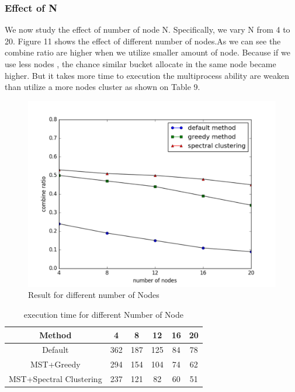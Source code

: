 \documentclass{vldb}
\begin{document}
\subsubsection{Effect of N}
We now study the effect of number of node N. Specifically, we vary N from 4 to 20. Figure 11 shows the effect of different number of nodes.As we can see the combine ratio are higher when we utilize smaller amount of node. Because if we use less nodes , the chance similar bucket allocate in the same node became higher. But it takes more time to execution the multiprocess ability are weaken than utilize a more nodes cluster as shown on Table 9.

\begin{figure}
\centering
\includegraphics[scale=0.45]{FNodeNumber}
\caption{Result for different number of Nodes}
\label{fig:NodeNumber}
\end{figure}

\begin{table} [h]
\centering
\caption{execution time for different Number of Node}
\label{tab:table}
\begin{tabular}{|c|c|c|c|c|c|} \hline
Method & 4 & 8 & 12 & 16 & 20 \\\hline
Default & 362 & 187 & 125 & 84  & 78\\\hline
MST+Greedy & 294 & 154 & 104 & 74 & 62\\\hline
MST+Spectral Clustering & 237 & 121 & 82 & 60 & 51\\\hline
\end{tabular}\\
\end{table}
\end{document}
